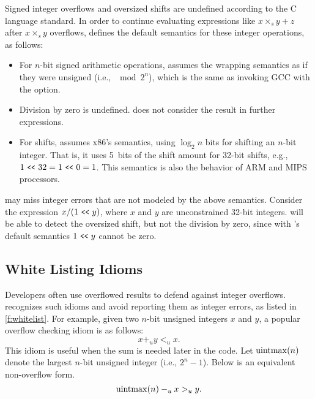 Signed integer overflows and oversized shifts are undefined according
to the C language standard.  In order to continue evaluating
expressions like $x \times_s y + z$ after $x \times_s y$ overflows,
\sys defines the default semantics for these integer operations, as
follows:
\begin{itemize}
\item
For $n$-bit signed arithmetic operations, \sys assumes the wrapping
semantics as if they were unsigned (i.e., $\mod{2^n}$), which is
the same as invoking GCC with the  option.
\item
Division by zero is undefined.  \sys does not consider the result
in further expressions.
\item
For shifts, \sys assumes x86's semantics, using $\log_2 n$ bits for
shifting an $n$-bit integer.  That is, it uses 5~bits of the shift
amount for 32-bit shifts, e.g., $1 \shl 32 = 1 \shl 0 = 1$.  This semantics
is also the behavior of ARM and MIPS processors.
\end{itemize}
\sys may miss integer errors that are not modeled by the above
semantics.  Consider the expression $x / (1 \shl y)$, where $x$ and
$y$ are unconstrained 32-bit integers.  \sys will be able to detect
the oversized shift, but not the division by zero, since
with \sys's default semantics $1 \shl y$ cannot be zero.

\subsection{White Listing Idioms}
\label{s:sema:whitelist}

Developers often use overflowed results to defend against integer
overflows.  \sys recognizes such idioms and avoid reporting them
as integer errors, as listed in \autoref{f:whitelist}.  For example,
given two $n$-bit unsigned integers $x$ and $y$, a popular overflow
checking idiom is as follows:
\begin{equation*}
x +_u y <_u x.
\end{equation*}
This idiom is useful when the sum is needed later in the code.
Let $\operatorname{uintmax}(n)$ denote the largest $n$-bit unsigned integer (i.e.,
$2^n - 1$).  Below is an equivalent non-overflow form.
\begin{equation*}
\operatorname{uintmax}(n) -_u x >_u y.
\end{equation*}

